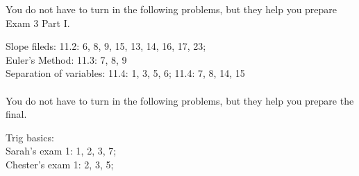 \documentclass[12pt,twoside]{article}
\begin{document}
You do not have to turn in the following problems, but they help you prepare Exam 3 Part I. 

Slope fileds: 11.2: 6, 8, 9, 15, 13, 14, 16, 17, 23; \\
Euler's Method: 11.3: 7, 8, 9 \\
Separation of variables: 11.4: 1, 3, 5, 6; 11.4: 7, 8, 14, 15 
\\
\\
You do not have to turn in the following problems, but they help you prepare the final. 

Trig basics: \\
Sarah's exam 1: 1, 2, 3, 7; \\
Chester's exam 1: 2, 3, 5;
\end{document}
